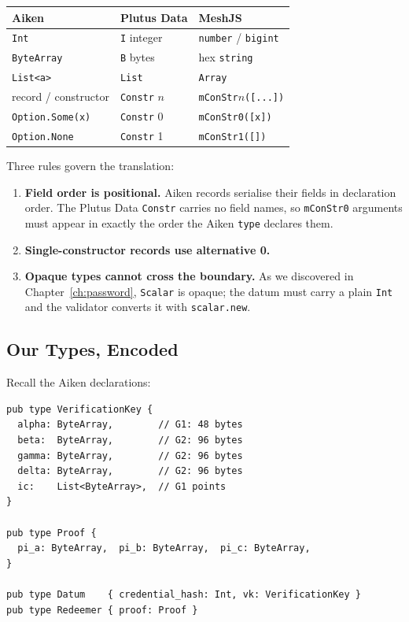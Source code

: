 \begin{center}
\begin{tabular}{lll}
  \hline
  \textbf{Aiken} & \textbf{Plutus Data} & \textbf{MeshJS} \\
  \hline
  \texttt{Int}            & \texttt{I} integer     & \texttt{number} / \texttt{bigint} \\
  \texttt{ByteArray}      & \texttt{B} bytes       & hex \texttt{string} \\
  \texttt{List<a>}        & \texttt{List}          & \texttt{Array} \\
  record / constructor    & \texttt{Constr} $n$    & \texttt{mConStr}$n$\texttt{([...])} \\
  \texttt{Option.Some(x)} & \texttt{Constr} 0      & \texttt{mConStr0([x])} \\
  \texttt{Option.None}    & \texttt{Constr} 1      & \texttt{mConStr1([])} \\
  \hline
\end{tabular}
\end{center}

Three rules govern the translation:

\begin{enumerate}
  \item \textbf{Field order is positional.} Aiken records serialise their fields
        in declaration order. The Plutus Data \texttt{Constr} carries no field
        names, so \texttt{mConStr0} arguments must appear in exactly the order
        the Aiken \texttt{type} declares them.
  \item \textbf{Single-constructor records use alternative 0.}
  \item \textbf{Opaque types cannot cross the boundary.} As we discovered in
        Chapter~\ref{ch:password}, \texttt{Scalar} is opaque; the datum must
        carry a plain \texttt{Int} and the validator converts it with
        \texttt{scalar.new}.
\end{enumerate}

\subsection*{Our Types, Encoded}

Recall the Aiken declarations:

\begin{verbatim}
pub type VerificationKey {
  alpha: ByteArray,        // G1: 48 bytes
  beta:  ByteArray,        // G2: 96 bytes
  gamma: ByteArray,        // G2: 96 bytes
  delta: ByteArray,        // G2: 96 bytes
  ic:    List<ByteArray>,  // G1 points
}

pub type Proof {
  pi_a: ByteArray,  pi_b: ByteArray,  pi_c: ByteArray,
}

pub type Datum    { credential_hash: Int, vk: VerificationKey }
pub type Redeemer { proof: Proof }
\end{verbatim}

